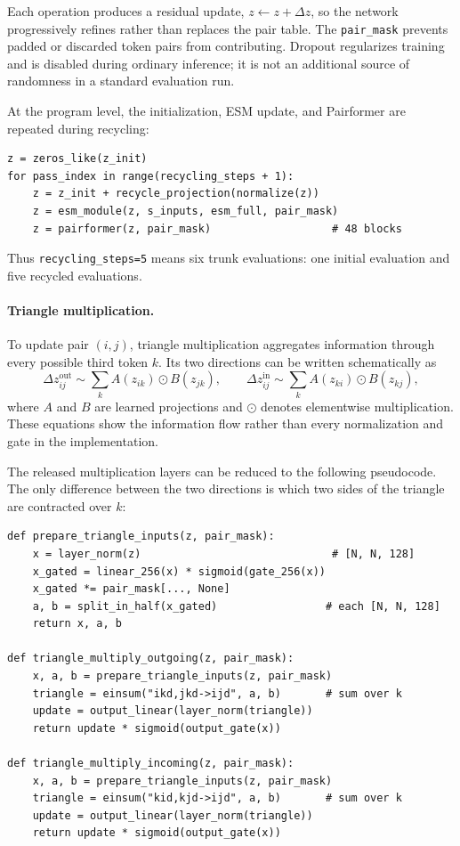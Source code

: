 \documentclass[11pt]{article}
\begin{document}
Each operation produces a residual update, $z\leftarrow z+\Delta z$, so the
network progressively refines rather than replaces the pair table. The
\texttt{pair\_mask} prevents padded or discarded token pairs from contributing.
Dropout regularizes training and is disabled during ordinary inference; it is
not an additional source of randomness in a standard evaluation run.

At the program level, the initialization, ESM update, and Pairformer are
repeated during recycling:
\begin{verbatim}
z = zeros_like(z_init)
for pass_index in range(recycling_steps + 1):
    z = z_init + recycle_projection(normalize(z))
    z = esm_module(z, s_inputs, esm_full, pair_mask)
    z = pairformer(z, pair_mask)                   # 48 blocks
\end{verbatim}
Thus \texttt{recycling\_steps=5} means six trunk evaluations: one initial
evaluation and five recycled evaluations.

\paragraph{Triangle multiplication.}
To update pair $(i,j)$, triangle multiplication aggregates information through
every possible third token $k$. Its two directions can be written schematically
as
\[
  \Delta z_{ij}^{\mathrm{out}}
  \sim\sum_k A(z_{ik})\odot B(z_{jk}),
  \qquad
  \Delta z_{ij}^{\mathrm{in}}
  \sim\sum_k A(z_{ki})\odot B(z_{kj}),
\]
where $A$ and $B$ are learned projections and $\odot$ denotes elementwise
multiplication. These equations show the information flow rather than every
normalization and gate in the implementation.

The released multiplication layers can be reduced to the following
pseudocode. The only difference between the two directions is which two sides
of the triangle are contracted over $k$:
\begin{verbatim}
def prepare_triangle_inputs(z, pair_mask):
    x = layer_norm(z)                              # [N, N, 128]
    x_gated = linear_256(x) * sigmoid(gate_256(x))
    x_gated *= pair_mask[..., None]
    a, b = split_in_half(x_gated)                 # each [N, N, 128]
    return x, a, b

def triangle_multiply_outgoing(z, pair_mask):
    x, a, b = prepare_triangle_inputs(z, pair_mask)
    triangle = einsum("ikd,jkd->ijd", a, b)       # sum over k
    update = output_linear(layer_norm(triangle))
    return update * sigmoid(output_gate(x))

def triangle_multiply_incoming(z, pair_mask):
    x, a, b = prepare_triangle_inputs(z, pair_mask)
    triangle = einsum("kid,kjd->ijd", a, b)       # sum over k
    update = output_linear(layer_norm(triangle))
    return update * sigmoid(output_gate(x))
\end{verbatim}
\end{document}
